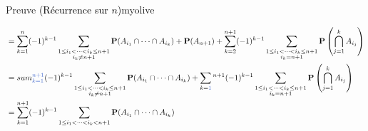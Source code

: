 \begin{demo}{Preuve \textcolor{black}{(Récurrence sur $n$)}}{myolive}
\begin{itemize}
\begin{align*}
                &= \sum_{k = 1}^{n} (-1)^{k-1} \sum_{\substack{1 \leq i_1 < \cdots < i_k \leq n+1 \\ i_k \neq n+1}} \mathbf{P}(A_{i_1} \cap \cdots \cap A_{i_k}) + \mathbf{P}(A_{n+1}) + \sum_{k = 2}^{n+1} (-1)^{k-1} \sum_{\substack{1 \leq i_1 < \cdots < i_k\leq n+1 \\ i_{k} = n+1}} \mathbf{P}\left(\bigcap_{j = 1}^{k} A_{i_j}\right) \\
                &= sum_{k = 1}^{\color{myblue} n+1} (-1)^{k-1} \sum_{\substack{1 \leq i_1 < \cdots < i_k \leq n+1 \\ i_k \neq n+1}} \mathbf{P}(A_{i_1} \cap \cdots \cap A_{i_k}) + \sum_{k = \color{myblue} 1}^{n+1} (-1)^{k-1} \sum_{\substack{1 \leq i_1 < \cdots < i_k\leq n+1 \\ i_{k} = n+1}} \mathbf{P}\left(\bigcap_{j = 1}^{k} A_{i_j}\right) \\ 
                &= \sum_{k= 1}^{n+1} (-1)^{k-1} \sum_{1 \leq i_1 < \cdots < i_k < n+1} \mathbf{P}(A_{i_1} \cap \cdots \cap A_{i_k})
            \end{align*}
        \end{itemize}
    \end{demo}

